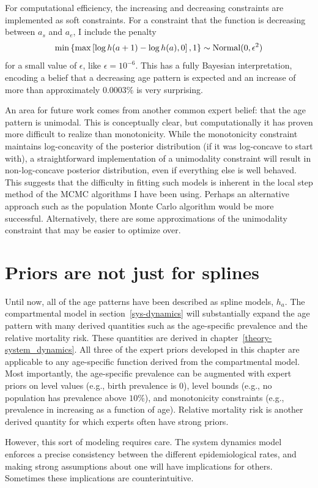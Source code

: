For computational efficiency, the increasing and decreasing
constraints are implemented as soft constraints.  For a constraint
that the function is decreasing between $a_s$ and $a_e$, I include the penalty
\[
\min\left\{\max\left[\log h(a+1) - \log h(a), 0\right], 1\right\} \sim \operatorname{Normal}(0, \epsilon^2)
\]
for a small value of $\epsilon$, like $\epsilon = 10^{-6}$.  This has
a fully Bayesian interpretation, encoding a belief that a decreasing age pattern is expected
and an increase of more than approximately $0.0003$\% is very surprising.


An area for future work comes from another common expert belief: that
the age pattern is unimodal.  This is conceptually clear, but
computationally it has proven more difficult to realize than
monotonicity.  While the monotonicity constraint maintains
log-concavity of the posterior distribution (if it was log-concave to
start with), a straightforward implementation of a unimodality
constraint will result in non-log-concave posterior distribution, even
if everything else is well behaved.  This suggests that the difficulty
in fitting such models is inherent in the local step method of the
MCMC algorithms I have been using.  Perhaps an alternative approach
such as the population Monte Carlo algorithm would be more successful.
Alternatively, there are some approximations of the unimodality
constraint that may be easier to optimize over.\cite{papp_shape_2012}

\section{Priors are not just for splines}
Until now, all of the age patterns have been described as spline models, $h_a$.
The compartmental model in section~\ref{sys-dynamics} will substantially
expand the age pattern with many derived quantities such as the age-specific
prevalence and the relative mortality risk. These quantities are
derived in chapter~\ref{theory-system_dynamics}.
All three of the expert priors developed in this chapter are
applicable to any age-specific function derived from the compartmental
model. Most importantly, the
age-specific prevalence can be augmented with expert
priors on level values (e.g., birth prevalence is $0$), level bounds
(e.g., no population has prevalence above $10$\%), and monotonicity
constraints (e.g., prevalence in increasing as a function of
age). Relative mortality risk is another derived quantity
for which experts often have strong priors.

However, this sort of modeling requires care. The system dynamics
model enforces a precise consistency between the different
epidemiological rates, and making strong assumptions about one will
have implications for others.  Sometimes these implications are
counterintuitive.

